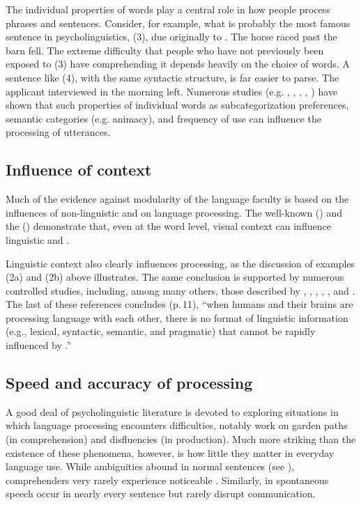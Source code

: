 \documentclass[a4paper]{article}
\begin{document}
The individual properties of words play a central role in how people process phrases and sentences.  Consider, for example, what is probably the most famous sentence in psycholinguistics, (3), due originally to \citep{Bever70}.
\ea
The horse raced past the barn fell.
\z
The extreme difficulty that people who have not previously been exposed to (3) have comprehending it depends heavily on the choice of words.  A sentence like (4), with the same syntactic structure, is far easier to parse.
\ea
The applicant interviewed in the morning left.
\z
Numerous studies (e.g. \citet{FordEtal82}, \citet{TrueswellEtal93}, \citet{MPS94a-u}, \citet{BresnanEtal2007}, \citet{WasowEtal2011}) have shown that such properties of individual words as subcategorization preferences, semantic categories (e.g. animacy), and frequency of use can influence the processing of utterances.  

\subsection{Influence of context}

Much of the evidence against modularity of the language faculty is based on the influences of non-linguistic  and  on language processing.  The well-known  (\citet{McGurkMacDonald76}) and the  (\citet{Stroop35}) demonstrate that, even at the word level, visual context can influence linguistic  and .

Linguistic context also clearly influences processing, as the discussion of examples (2a) and (2b) above illustrates.  The same conclusion is supported by numerous controlled studies, including,
among many others, those described by \citet{CS85a}, \citet{AltmannSteedman88}, \citet{Branigan2007}, \citet{Tooley2007a}, \citet{MatsukiEtal2011}, and \citet{SpevackEtal2018}.  The last of these references concludes (p.\,11), ``when humans and their brains are processing language with each other, there is no format of linguistic information (e.g., lexical, syntactic, semantic, and pragmatic) that cannot be rapidly
influenced by .''

\subsection{Speed and accuracy of processing}

A good deal of psycholinguistic literature is devoted to exploring situations in which language processing encounters difficulties, notably work on garden paths (in comprehension) and disfluencies (in production).  Much more striking than the existence of these phenomena, however, is how little they matter in everyday language use.  While ambiguities abound in normal sentences (see \citet{Wasow2015}), comprehenders very rarely experience noticeable .  Similarly,  in spontaneous speech occur in nearly every sentence but rarely disrupt communication.  
\end{document}
